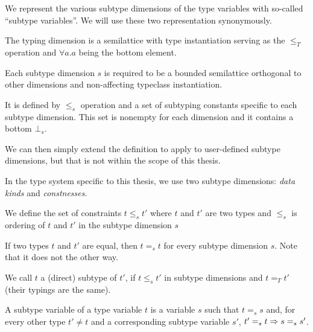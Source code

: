 We represent the various subtype dimensions of the type variables with so-called ``subtype variables''. We will use these two representation synonymously.


\begin{defn}
    The typing dimension is a semilattice with type instantiation serving as the $\leq_T$ operation and $\forall a . a$ being the bottom element.
\end{defn}

\begin{defn}
    Each subtype dimension $s$ is required to be a bounded semilattice orthogonal to other dimensions and non-affecting typeclass instantiation.
    
    It is defined by $\leq_s$ operation and a set of subtyping constants specific to each subtype dimension. This set is nonempty for each dimension and it contains a bottom $\bot_s$.
    
    We can then simply extend the definition to apply to user-defined subtype dimensions, but that is not within the scope of this thesis.

    In the type system specific to this thesis, we use two subtype dimensions: \textit{data kinds} and \textit{constnesses}.
\end{defn}


\begin{defn}
    We define the set of constraints $t \leq_s t'$ where $t$ and $t'$ are two types and $\leq_s$ is ordering of $t$ and $t'$ in the subtype dimension $s$
\end{defn}

\begin{defn}
    If two types $t$ and $t'$ are equal, then $t =_s t$ for every subtype dimension $s$. Note that it does not the other way.
\end{defn}

\begin{defn}[Subtype]
    We call $t$ a (direct) subtype of $t'$, if $t \leq_s t'$ in subtype dimensions and $t =_T t'$ (their typings are the same).
\end{defn}

\begin{defn}
    A subtype variable of a type variable $t$ is a variable $s$ such that $t =_s s$ and, for every other type $t' \neq t$ and a corresponding subtype variable $s'$, $t' =_s t \Rightarrow s =_s s'$.
\end{defn}

